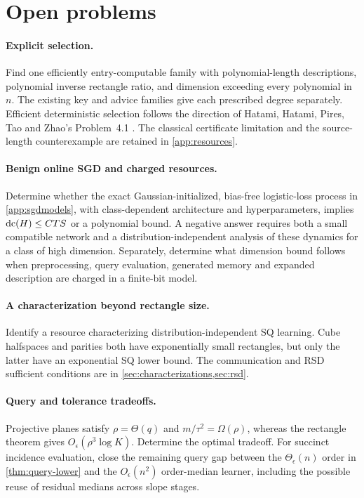 \section{Open problems}\label{sec:open}\label{sec:discussion}
\paragraph{Explicit selection.}
Find one efficiently entry-computable family with polynomial-length descriptions, polynomial inverse rectangle ratio, and dimension exceeding every polynomial in $n$. The existing key and advice families give each prescribed degree separately. Efficient deterministic selection follows the direction of Hatami, Hatami, Pires, Tao and Zhao's Problem~4.1 \citep{HHPTZ22}. The classical certificate limitation and the source-length counterexample are retained in \cref{app:resources}.

\paragraph{Benign online SGD and charged resources.}
Determine whether the exact Gaussian-initialized, bias-free logistic-loss process in \cref{app:sgdmodels}, with class-dependent architecture and hyperparameters, implies $\operatorname{dc}(H)\le CTS$ or a polynomial bound. A negative answer requires both a small compatible network and a distribution-independent analysis of these dynamics for a class of high dimension. Separately, determine what dimension bound follows when preprocessing, query evaluation, generated memory and expanded description are charged in a finite-bit model.

\paragraph{A characterization beyond rectangle size.}
Identify a resource characterizing distribution-independent SQ learning. Cube halfspaces and parities both have exponentially small rectangles, but only the latter have an exponential SQ lower bound. The communication and RSD sufficient conditions are in \cref{sec:characterizations,sec:rsd}.

\paragraph{Query and tolerance tradeoffs.}
Projective planes satisfy $\rho=\Theta(q)$ and $m/\tau^2=\Omega(\rho)$, whereas the rectangle theorem gives $O_\epsilon(\rho^3\log K)$. Determine the optimal tradeoff. For succinct incidence evaluation, close the remaining query gap between the $\Theta_\epsilon(n)$ order in \cref{thm:query-lower} and the $O_\epsilon(n^2)$ order-median learner, including the possible reuse of residual medians across slope stages.
